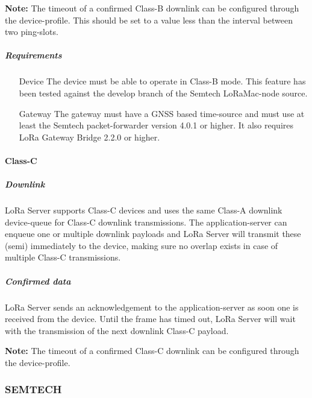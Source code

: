 \textbf{Note:} The timeout of a confirmed Class-B downlink can be configured through the device-profile.
This should be set to a value less than the interval between two ping-slots.

\subparagraph{Requirements}

\begin{itemize}
	\item[Device]
	The device must be able to operate in Class-B mode.
This feature has been tested against the develop branch of the Semtech LoRaMac-node source.
	\item[Gateway]
	The gateway must have a GNSS based time-source and must use at least the Semtech packet-forwarder version 4.0.1 or higher.
It also requires LoRa Gateway Bridge 2.2.0 or higher.

\end{itemize}


\paragraph{Class-C}

\subparagraph{Downlink}
LoRa Server supports Class-C devices and uses the same Class-A downlink device-queue for Class-C downlink transmissions.
The application-server can enqueue one or multiple downlink payloads and LoRa Server will transmit these (semi) immediately to the device,
	making sure no overlap exists in case of multiple Class-C transmissions.

\subparagraph{Confirmed data}
LoRa Server sends an acknowledgement to the application-server as soon one is received from the device.
Until the frame has timed out,
	LoRa Server will wait with the transmission of the next downlink Class-C payload.

\textbf{Note:} The timeout of a confirmed Class-C downlink can be configured through the device-profile.




\subsubsection{SEMTECH}



